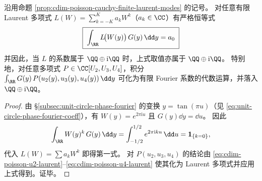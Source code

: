 \begin{corollary}\label{cor:cdim-poisson-cauchy-laurent-integrals-rational}
沿用命题 \ref{prop:cdim-poisson-cauchy-finite-laurent-modes} 的记号。
对任意有限 Laurent 多项式 \(L(W)=\sum_{k=-K}^{K}a_k W^k\)（\(a_k\in\CC\)）有严格恒等式
\[
\boxed{\;
\int_{\RR} L\!\bigl(W(y)\bigr)\,G(y)\,\dd y=a_0\;}
\]
并因此，当 \(L\) 的系数属于 \(\QQ\oplus \mathrm{i}\QQ\) 时，上式取值亦属于 \(\QQ\oplus \mathrm{i}\QQ\)。
特别地，对任意多项式 \(P\in\CC[U_2,U_3,U_4]\)，积分
\(
\int_{\RR}G(y)\,P(u_2(y),u_3(y),u_4(y))\,\dd y
\)
可化为有限 Fourier 系数的代数运算，并落入 \(\QQ\oplus \mathrm{i}\QQ\)。
\end{corollary}
\begin{proof}
由 \S\ref{subsec:unit-circle-phase-fourier} 的变换 \(y=\tan(\pi u)\)（见 \eqref{eq:unit-circle-phase-fourier-coeff}），有 \(W(y)=e^{2\pi\mathrm{i}u}\) 且 \(G(y)\dd y=\dd u\)。
因此
\[
\int_{\RR} W(y)^k\,G(y)\,\dd y=\int_{-1/2}^{1/2}e^{2\pi\mathrm{i}ku}\,\dd u=\mathbf 1_{\{k=0\}},
\]
代入 \(L(W)=\sum a_k W^k\) 即得第一式。
对 \(P(u_2,u_3,u_4)\) 的结论由 \eqref{eq:cdim-poisson-u2-laurent}--\eqref{eq:cdim-poisson-u4-laurent} 使其化为 Laurent 多项式并应用上式得到。证毕。
\end{proof}

